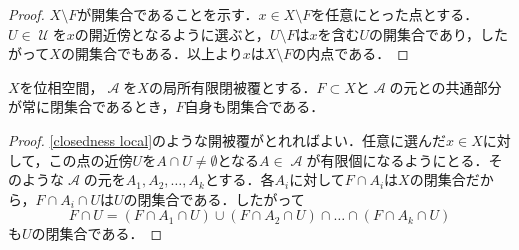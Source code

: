 \documentclass[uplatex]{jsarticle}
\begin{document}
\begin{proof}
  $X\setminus F$が開集合であることを示す．$x\in X\setminus F$を任意にとった点とする．$U\in \mscrU$を$x$の開近傍となるように選ぶと，$U\setminus F$は$x$を含む$U$の開集合であり，したがって$X$の開集合でもある．以上より$x$は$X\setminus F$の内点である．
\end{proof}

\begin{proposition}\label{locally finite closed cover}
  $X$を位相空間，$\mscrA$を$X$の局所有限閉被覆とする．$F\subset X$と$\mscrA$の元との共通部分が常に閉集合であるとき，$F$自身も閉集合である．
\end{proposition}

\begin{proof}
  \cref{closedness local}のような開被覆がとれればよい．任意に選んだ$x\in X$に対して，この点の近傍$U$を$A\cap U\neq \emptyset$となる$A\in \mscrA$が有限個になるようにとる．そのような$ \mscrA$の元を$A_1, A_2, \dots ,A_k$とする．各$A_i$に対して$F\cap A_i$は$X$の閉集合だから，$F\cap A_i \cap U$は$U$の閉集合である．したがって
  \[ F\cap U = (F\cap A_1 \cap U)\cup (F\cap A_2 \cap U)\cap \dots \cap (F\cap A_k \cap U) \]
  も$U$の閉集合である．
\end{proof}


\nocite{HatcherAT}

\end{document}
